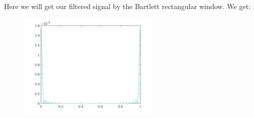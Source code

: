 \documentclass[a4paper,11pt]{article}
\begin{document}
Here we will get our filtered signal by the Bartlett rectangular window. We get:

\begin{figure}[!hp]
    \begin{center}
      \includegraphics[width=0.6\textwidth]{images/lab2_40.jpg}
    \end{center}
\end{figure}
\end{document}
